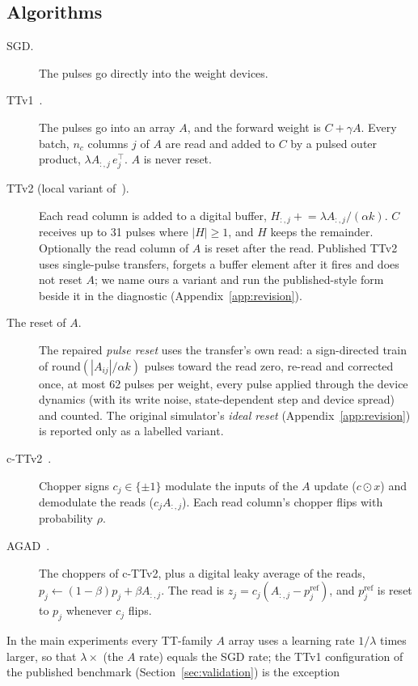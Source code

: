 \subsection{Algorithms}\label{sec:algos}
\begin{description}
\item[SGD.] The pulses go directly into the weight devices.
\item[TTv1~\cite{gokmen2020}.] The pulses go into an array $A$, and the forward weight is $C+\gamma A$. Every batch, $n_c$ columns
      $j$ of $A$ are read and added to $C$ by a pulsed outer product, $\lambda A_{:,j}\,e_j^{\top}$. $A$ is never reset.
\item[TTv2 (local variant of~\cite{gokmen2021}).] Each read column is added to a digital buffer,
      $H_{:,j}\mathrel{+}=\lambda A_{:,j}/(\alpha k)$. $C$ receives up to 31 pulses where $|H|\ge1$, and $H$ keeps the remainder.
      Optionally the read column of $A$ is reset after the read. Published TTv2 uses single-pulse transfers, forgets a buffer
      element after it fires and does not reset $A$; we name ours a variant and run the published-style form beside it in the
      diagnostic (Appendix~\ref{app:revision}).
\item[The reset of $A$.] The repaired \emph{pulse reset} uses the
      transfer's own read: a sign-directed train of $\mathrm{round}(|A_{ij}|/\alpha k)$ pulses toward the read zero, re-read
      and corrected once, at most 62 pulses per weight, every pulse applied through the device dynamics (with its write noise,
      state-dependent step and device spread) and counted. The original simulator's \emph{ideal reset} (Appendix~\ref{app:revision}) is reported only as a labelled variant.
\item[c-TTv2~\cite{rasch2024}.] Chopper signs $c_j\in\{\pm1\}$ modulate the inputs of the $A$ update ($c\odot x$) and demodulate
      the reads ($c_jA_{:,j}$). Each read column's chopper flips with probability $\rho$.
\item[AGAD~\cite{rasch2024}.] The choppers of c-TTv2, plus a digital leaky average of the reads,
      $p_j\leftarrow(1-\beta)p_j+\beta A_{:,j}$. The read is $z_j=c_j(A_{:,j}-p^{\mathrm{ref}}_j)$, and $p^{\mathrm{ref}}_j$ is
      reset to $p_j$ whenever $c_j$ flips.
\end{description}
In the main experiments every TT-family $A$ array uses a learning rate $1/\lambda$ times larger, so that $\lambda\times$ (the $A$
rate) equals the SGD rate; the TTv1 configuration of the published benchmark (Section~\ref{sec:validation}) is the exception
